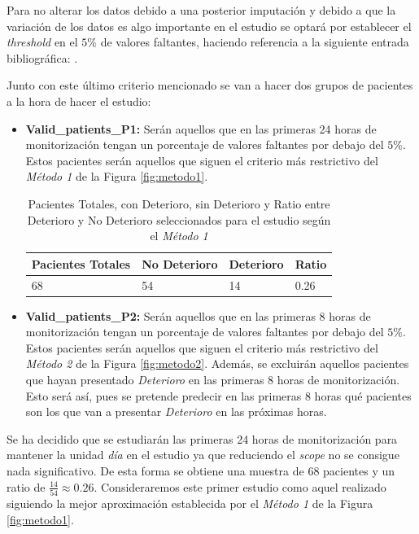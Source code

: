 Para no alterar los datos debido a una posterior imputación y debido a que la variación de los datos es algo importante en el estudio se optará por establecer el \textit{threshold} en el $5 \%$ de valores faltantes, haciendo referencia a la siguiente entrada bibliográfica: \cite{Scheffer2002}. 

Junto con este último criterio mencionado se van a hacer dos grupos de pacientes a la hora de hacer el estudio:

\begin{itemize}
    \item \textbf{Valid\_patients\_P1:} Serán aquellos que en las primeras 24 horas de monitorización tengan un porcentaje de valores faltantes por debajo del $5\%$. Estos pacientes serán aquellos que siguen el criterio más restrictivo del \textit{Método 1} de la Figura \ref{fig:metodo1}. 
    \begin{table}[H]
        \centering
        \begin{tabular}{|m{2cm}|m{2.25cm}|m{2cm}|m{2cm}|}
        \hline
            Pacientes Totales & No Deterioro & Deterioro & Ratio \\ \hline
            68 & 54 & 14 & 0.26 \\ \hline
        \end{tabular}
        \caption{Pacientes Totales, con Deterioro, sin Deterioro y Ratio entre Deterioro y No Deterioro seleccionados para el estudio según el \textit{Método 1}}
            \label{tabla:ratio-deterioro-P1}
    \end{table}
    \item \textbf{Valid\_patients\_P2:} Serán aquellos que en las primeras 8 horas de monitorización tengan un porcentaje de valores faltantes por debajo del $5\%$. Estos pacientes serán aquellos que siguen el criterio más restrictivo del \textit{Método 2} de la Figura \ref{fig:metodo2}. Además, se excluirán aquellos pacientes que hayan presentado \textit{Deterioro} en las primeras 8 horas de monitorización. Esto será así, pues se pretende predecir en las primeras 8 horas qué pacientes son los que van a presentar \textit{Deterioro} en las próximas horas.
\end{itemize}


Se ha decidido que se estudiarán las primeras 24 horas de monitorización para mantener la unidad \textit{día} en el estudio ya que reduciendo el \textit{scope} no se consigue nada significativo. De esta forma se obtiene una muestra de $68$ pacientes y un ratio de $ \frac{14}{54} \approx 0.26 $. Consideraremos este primer estudio como aquel realizado siguiendo la mejor aproximación establecida por el \textit{Método 1} de la Figura \ref{fig:metodo1}.

